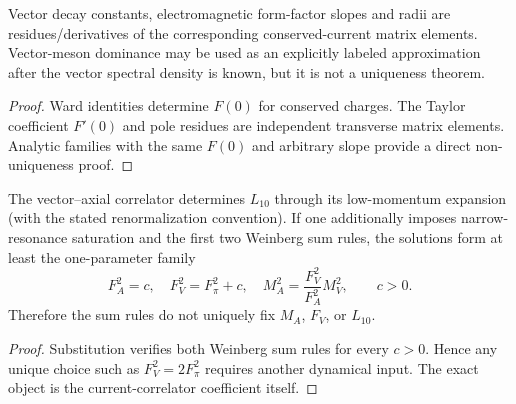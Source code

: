 \documentclass[12pt,a4paper]{article}
\begin{document}
\begin{corollary}
\label{p11:cor:native-vector-current-constants}

Vector decay constants, electromagnetic form-factor slopes and radii are residues/derivatives of the corresponding conserved-current matrix elements.  Vector-meson dominance may be used as an explicitly labeled approximation after the vector spectral density is known, but it is not a uniqueness theorem.
\label{p11:eq:native-L9-vector}
\label{p11:eq:native-pion-charge-radius-vector}
\label{p11:eq:native-kl3-vector-slopes}
\end{corollary}
\begin{proof}

Ward identities determine \(F(0)\) for conserved charges.  The Taylor coefficient \(F'(0)\) and pole residues are independent transverse matrix elements.  Analytic families with the same \(F(0)\) and arbitrary slope provide a direct non-uniqueness proof.
\end{proof}

\begin{theorem}
\label{p11:thm:native-axial-pole-L10}

The vector--axial correlator determines \(L_{10}\) through its low-momentum expansion (with the stated renormalization convention).  If one additionally imposes narrow-resonance saturation and the first two Weinberg sum rules, the solutions form at least the one-parameter family
\[
F_A^2=c,\quad F_V^2=F_\pi^2+c,\quad
M_A^2=\frac{F_V^2}{F_A^2}M_V^2,
\qquad c>0.
\]
Therefore the sum rules do not uniquely fix \(M_A\), \(F_V\), or \(L_{10}\).
\label{p11:eq:native-axial-pole-mass}
\label{p11:eq:native-L10}
\label{p11:eq:native-axial-strange-operator}
\end{theorem}
\begin{proof}

Substitution verifies both Weinberg sum rules for every \(c>0\).  Hence any unique choice such as \(F_V^2=2F_\pi^2\) requires another dynamical input.  The exact object is the current-correlator coefficient itself.
\end{proof}
\end{document}
